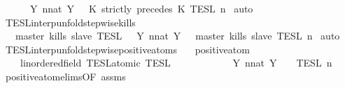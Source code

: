 \begin{isabellebody}
\ \ \ \ {\isacharequal}\ {\isasymInter}\ {\isacharbraceleft}Y{\isachardot}\ {\isasymexists}n{\isacharcolon}{\isacharcolon}nat{\isachardot}\ Y\ {\isacharequal}\ {\isasymlbrakk}\ K\ strictly\ precedes\ K\ {\isasymrbrakk}\isactrlsub T\isactrlsub E\isactrlsub S\isactrlsub L\isactrlbsup {\isasymge}\ n\isactrlesup {\isacharbraceright}{\isacartoucheclose}\isanewline
%
\isadelimproof
%
\endisadelimproof
%
\isatagproof
{}\isamarkupfalse%
\ auto%
\endisatagproof
{\isafoldproof}%
%
\isadelimproof
\isanewline
%
\endisadelimproof
\isanewline
{}\isamarkupfalse%
\ TESL{\isacharunderscore}interp{\isacharunderscore}unfold{\isacharunderscore}stepwise{\isacharunderscore}kills{\isacharcolon}\isanewline
\ \ {\isacartoucheopen}{\isasymlbrakk}\ master\ kills\ slave\ {\isasymrbrakk}\isactrlsub T\isactrlsub E\isactrlsub S\isactrlsub L\ {\isacharequal}\ {\isasymInter}\ {\isacharbraceleft}Y{\isachardot}\ {\isasymexists}n{\isacharcolon}{\isacharcolon}nat{\isachardot}\ Y\ {\isacharequal}\ {\isasymlbrakk}\ master\ kills\ slave\ {\isasymrbrakk}\isactrlsub T\isactrlsub E\isactrlsub S\isactrlsub L\isactrlbsup {\isasymge}\ n\isactrlesup {\isacharbraceright}{\isacartoucheclose}\isanewline
%
\isadelimproof
%
\endisadelimproof
%
\isatagproof
{}\isamarkupfalse%
\ auto%
\endisatagproof
{\isafoldproof}%
%
\isadelimproof
\isanewline
%
\endisadelimproof
\isanewline
{}\isamarkupfalse%
\ TESL{\isacharunderscore}interp{\isacharunderscore}unfold{\isacharunderscore}stepwise{\isacharunderscore}positive{\isacharunderscore}atoms{\isacharcolon}\isanewline
\ \ \ {\isacartoucheopen}positive{\isacharunderscore}atom\ {\isasymphi}{\isacartoucheclose}\isanewline
\ \ \ {\isacartoucheopen}{\isasymlbrakk}\ {\isasymphi}{\isacharcolon}{\isacharcolon}{\isacharprime}{\isasymtau}{\isacharcolon}{\isacharcolon}linordered{\isacharunderscore}field\ TESL{\isacharunderscore}atomic\ {\isasymrbrakk}\isactrlsub T\isactrlsub E\isactrlsub S\isactrlsub L\isanewline
\ \ \ \ \ \ \ \ \ \ {\isacharequal}\ {\isasymUnion}\ {\isacharbraceleft}Y{\isachardot}\ {\isasymexists}n{\isacharcolon}{\isacharcolon}nat{\isachardot}\ Y\ {\isacharequal}\ {\isasymlbrakk}\ {\isasymphi}\ {\isasymrbrakk}\isactrlsub T\isactrlsub E\isactrlsub S\isactrlsub L\isactrlbsup {\isasymge}\ n\isactrlesup {\isacharbraceright}{\isacartoucheclose}\isanewline
%
\isadelimproof
%
\endisadelimproof
%
\isatagproof
{}\isamarkupfalse%
\ {\isacharminus}\isanewline
\ \ \isamarkupfalse%
\ positive{\isacharunderscore}atom{\isachardot}elims{\isacharparenleft}{}{\isacharparenright}{\isacharbrackleft}OF\ assms{\isacharbrackright}\isanewline

\end{isabellebody}
